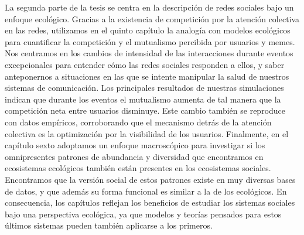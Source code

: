 La segunda parte de la tesis se centra en la descripción de redes sociales bajo un enfoque ecológico. Gracias a la existencia de competición por la atención colectiva en las redes, utilizamos en el quinto capítulo la analogía con modelos ecológicos para cuantificar la competición y el mutualismo percibida por usuarios y memes. Nos centramos en los cambios de intensidad de las interacciones durante eventos excepcionales para entender cómo las redes sociales responden a ellos, y saber anteponernos a situaciones en las que se intente manipular la salud de nuestros sistemas de comunicación. Los principales resultados de nuestras simulaciones indican que durante los eventos el mutualismo aumenta de tal manera que la competición neta entre usuarios disminuye. Este cambio también se reproduce con datos empíricos, corroborando que el mecanismo detrás de la atención colectiva es la optimización por la visibilidad de los usuarios. Finalmente, en el capítulo sexto adoptamos un enfoque macroscópico para investigar si los omnipresentes patrones de abundancia y diversidad que encontramos en ecosistemas ecológicos también están presentes en los ecosistemas sociales. Encontramos que la versión social de estos patrones existe en muy diversas bases de datos, y que además su forma funcional es similar a la de los ecológicos. En consecuencia, los capítulos reflejan los beneficios de estudiar los sistemas sociales bajo una perspectiva ecológica, ya que modelos y teorías pensados para estos últimos sistemas pueden también aplicarse a los primeros.
\newpage

   